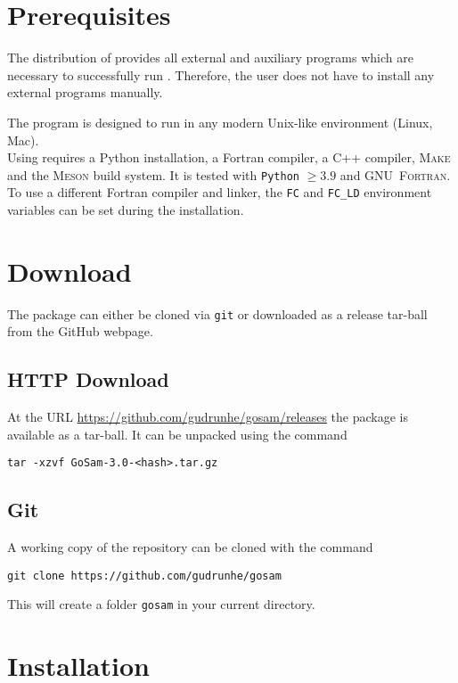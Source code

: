 \section{Prerequisites}

The distribution of \gosamv provides all external and auxiliary programs which are necessary 
to successfully run \gosam. 
Therefore, the user does not have to install any external programs manually.

The program \gosam is designed to run in any modern Unix-like environment (Linux, Mac).\\
Using \gosam requires a Python installation, a Fortran compiler, a C++ compiler, \textsc{Make} and the \textsc{Meson} build system. It is tested with \texttt{Python} $\geq 3.9$ and \textsc{GNU~Fortran}.
To use a different Fortran compiler and linker, the \texttt{FC} and \texttt{FC\_LD} environment variables can
be set during the installation.


\section{Download}

The \gosamv package can either be cloned 
via \texttt{git}
or downloaded as a release tar-ball from the GitHub webpage.

\subsection*{HTTP Download}
At the URL \url{https://github.com/gudrunhe/gosam/releases} the package
\gosamv is available as a tar-ball. 
It can be unpacked using the command
\begin{lstlisting}[style=sh]
tar -xzvf GoSam-3.0-<hash>.tar.gz
\end{lstlisting}

\subsection*{Git}
A working copy of the repository can be cloned with the command
\begin{lstlisting}[style=sh]
git clone https://github.com/gudrunhe/gosam
\end{lstlisting}
This will create a folder \texttt{gosam} in your current directory.

\section{Installation}

